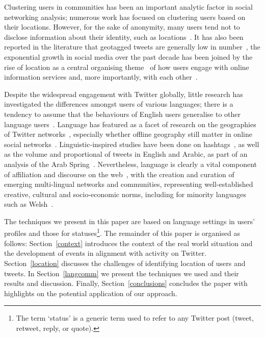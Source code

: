 \documentclass[conference]{IEEEtran}
\begin{document}
Clustering users in communities has been an important analytic factor
in social networking analysis; numerous work has focused on clustering
users based on their locations. However, for the sake of anonymity,
many users tend not to disclose information about their identity, such
as locations~\cite{kang-et-al:2013}. It has also been reported in the
literature that geotagged tweets are generally low in
number~\cite{morstatter-et-al:2013,tan-et-al:2013,kumar-et-al:2014},
the exponential growth in social media over the past decade has been
joined by the rise of location as a central organising
theme~\cite{liang-et-al:2013} of how users engage with online
information services and, more importantly, with each
other~\cite{cheng-et-al:2010,caverlee-et-al:2013}.

Despite the widespread engagement with Twitter globally, little
research has investigated the differences amongst users of various
languages; there is a tendency to assume that the behaviours of
English users generalise to other language
users~\cite{hong-et-al:2011}. Language has featured as a facet of
research on the geographies of Twitter
networks~\cite{takhteyev-et-al:2012}, especially whether offline
geography still matter in online social
networks~\cite{kulshrestha-et-al:2012}. Linguistic-inspired studies
have been done on hashtags~\cite{cunha-et-al:2011}, as well as the
volume and proportional of tweets in English and Arabic, as part of an
analysis of the Arab Spring~\cite{bruns-et-al:2013}. Nevertheless,
language is clearly a vital component of affiliation and discourse on
the web~\cite{zappavigna+martin:2012}, with the creation and curation
of emerging multi-lingual networks and communities, representing
well-established creative, cultural and socio-economic norms,
including for minority languages such as Welsh~\cite{gj+uj:2013}.

The techniques we present in this paper are based on language settings
in users' profiles and those for statuses\footnote{The term `status'
is a generic term used to refer to any Twitter post (tweet, retweet,
reply, or quote).}. The remainder of this paper is organised as
follows: Section~\ref{context} introduces the context of the real
world situation and the development of events in alignment with
activity on Twitter. Section~\ref{location} discusses the challenges
of identifying location of users and tweets. In Section~\ref{langcomm}
we present the techniques we used and their results and
discussion. Finally, Section~\ref{conclusions} concludes the paper
with highlights on the potential application of our approach.
\end{document}
